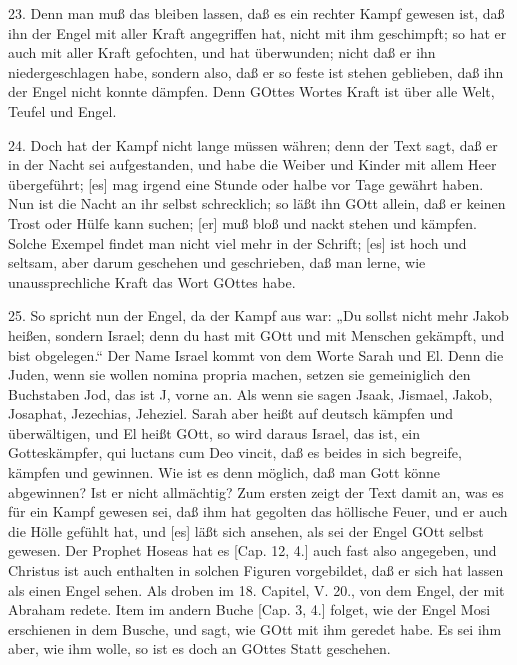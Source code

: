 23. Denn man muß das bleiben lassen, daß es ein rechter Kampf gewesen ist, daß ihn der Engel mit aller Kraft angegriffen hat, nicht mit ihm geschimpft; so hat er auch mit aller Kraft gefochten, und hat überwunden; nicht daß er ihn niedergeschlagen habe, sondern also, daß er so feste ist stehen geblieben, daß ihn der Engel nicht konnte dämpfen. Denn GOttes Wortes Kraft ist über alle Welt, Teufel und Engel.

24. Doch hat der Kampf nicht lange müssen währen; denn der Text sagt, daß er in der Nacht sei aufgestanden, und habe die Weiber und Kinder mit allem Heer übergeführt; [es] mag irgend eine Stunde oder halbe vor Tage gewährt haben. Nun ist die Nacht an ihr selbst schrecklich; so läßt ihn GOtt allein, daß er keinen Trost oder Hülfe kann suchen; [er] muß bloß und nackt stehen und kämpfen. Solche Exempel findet man nicht viel mehr in der Schrift; [es] ist hoch und seltsam, aber darum geschehen und geschrieben, daß man lerne, wie unaussprechliche Kraft das Wort GOttes habe.

25. So spricht nun der Engel, da der Kampf aus war: „Du sollst nicht mehr Jakob heißen, sondern Israel; denn du hast mit GOtt und mit Menschen gekämpft, und bist obgelegen.“ Der Name Israel kommt von dem Worte Sarah und El. Denn die Juden, wenn sie wollen nomina propria machen, setzen sie gemeiniglich den Buchstaben Jod, das ist J, vorne an. Als wenn sie sagen Jsaak, Jismael, Jakob, Josaphat, Jezechias, Jeheziel. Sarah aber heißt auf deutsch kämpfen und überwältigen, und El heißt GOtt, so wird daraus Israel, das ist, ein Gotteskämpfer, qui luctans cum Deo vincit, daß es beides in sich begreife, kämpfen und gewinnen. Wie ist es denn möglich, daß man Gott könne abgewinnen? Ist er nicht allmächtig? Zum ersten zeigt der Text damit an, was es für ein Kampf gewesen sei, daß ihm hat gegolten das höllische Feuer, und er auch die Hölle gefühlt hat, und [es] läßt sich ansehen, als sei der Engel GOtt selbst gewesen. Der Prophet Hoseas hat es [Cap. 12, 4.] auch fast also angegeben, und Christus ist auch enthalten in solchen Figuren vorgebildet, daß er sich hat lassen als einen Engel sehen. Als droben im 18. Capitel, V. 20., von dem Engel, der mit Abraham redete. Item im andern Buche [Cap. 3, 4.] folget, wie der Engel Mosi erschienen in dem Busche, und sagt, wie GOtt mit ihm geredet habe. Es sei ihm aber, wie ihm wolle, so ist es doch an GOttes Statt geschehen.

